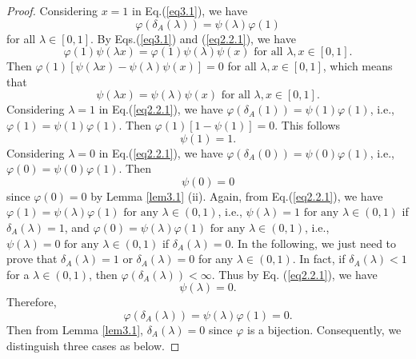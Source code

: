 \documentclass[12pt]{article}
\begin{document}
\begin{proof}
Considering $x=1$ in Eq.(\ref{eq3.1}), we have
\begin{equation}\label{eq2.2.1}
\varphi(\delta_{A}(\lambda))=\psi(\lambda)\varphi(1)
\end{equation}
 for all $\lambda \in[0, 1]$.
 By Eqs.(\ref{eq3.1}) and (\ref{eq2.2.1}), we have
 \begin{equation*}
\varphi(1)\psi(\lambda x)=\varphi(1)\psi(\lambda)\psi(x)\mbox{ for all } \lambda, x\in[0, 1].
 \end{equation*}
 Then $\varphi(1)[\psi(\lambda x)-\psi(\lambda)\psi(x)]=0$ for all $\lambda, x\in[0, 1]$, which means that \begin{equation}\label{eq2.2.4}
\psi(\lambda x)=\psi(\lambda)\psi(x)\mbox{ for all } \lambda, x\in[0, 1].
 \end{equation}
Considering $\lambda=1$ in Eq.(\ref{eq2.2.1}), we have
 $\varphi(\delta_{A}(1))=\psi(1)\varphi(1)$, i.e., $\varphi(1)=\psi(1)\varphi(1)$. Then $\varphi(1)[1-\psi(1)]=0$. This follows
 \begin{equation}\label{eq2.2.2}
 \psi(1)=1.
 \end{equation}
Considering $\lambda=0$ in Eq.(\ref{eq2.2.1}), we have
 $\varphi(\delta_{A}(0))=\psi(0)\varphi(1)$, i.e., $\varphi(0)=\psi(0)\varphi(1)$. Then
\begin{equation}\label{eq2.2.3}
\psi(0)=0
 \end{equation}
since $\varphi(0)=0$ by Lemma \ref{lem3.1} (ii). Again, from Eq.(\ref{eq2.2.1}), we have
$\varphi(1)=\psi(\lambda)\varphi(1)\mbox{ for any } \lambda \in(0, 1)$, i.e., $\psi(\lambda)=1 \mbox{ for any } \lambda \in(0, 1)$ if $\delta_{A}(\lambda)=1$,
and
$\varphi(0)=\psi(\lambda)\varphi(1)\mbox{ for any } \lambda \in(0, 1)$, i.e., $\psi(\lambda)=0 \mbox{ for any } \lambda \in(0, 1)$ if $\delta_{A}(\lambda)=0$.
In the following, we just need to prove that $\delta_{A}(\lambda)=1$ or $\delta_{A}(\lambda)=0$ for any $\lambda\in
(0,1)$. In fact, if $\delta_{A}(\lambda)<1$ for a $\lambda \in(0, 1)$, then $\varphi(\delta_{A}(\lambda))<\infty$.
Thus by Eq. (\ref {eq2.2.1}), we have
\begin{equation*}\label{eq2.2.5}
\psi(\lambda)=0.
\end{equation*}
Therefore,
\begin{equation*}
\varphi(\delta_{A}(\lambda))=\psi(\lambda)\varphi(1)=0.
\end{equation*}
Then from Lemma \ref{lem3.1}, $\delta_{A}(\lambda)=0$ since $\varphi$ is a bijection. Consequently, we distinguish three cases as below.

\end{proof}
\end{document}

